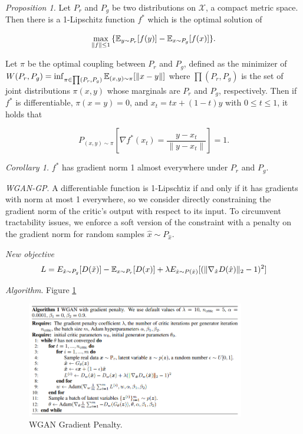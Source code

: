 \documentclass[english]{article}
\begin{document}
\item {\emph{Proposition 1.}}
Let $P_r$ and $P_g$ be two distributions on $\mathcal{X}$, a compact metric space. Then there is a 1-Lipschitz function $f^*$ which is the optimal solution of 

$$\max_{\|f\|\le 1} {\{\mathbb{E}_{y\sim P_r}[f(y)]-\mathbb{E}_{x\sim P_g}[f(x)]\}}.$$ 

Let $\pi$ be the optimal coupling between $P_r$ and $P_g$, defined as the minimizer of $W(P_r,P_g)=\inf_{\pi\in \prod(P_r,P_g)}\mathbb{E}_{(x,y)\sim\pi}[\|x-y\|]$ where $\prod(P_r,P_g)$ is the set of joint distributions $\pi(x,y)$ whose marginals are $P_r$ and $P_g$, respectively. Then if $f^*$ is differentiable, $\pi(x=y)=0$, and $x_t=tx+(1-t)y$ with $0\le t\le 1$, it holds that 

$$P_{(x,y)\sim\pi}[\nabla f^*(x_t)=\frac{y-x_t}{\|y-x_t\|}]=1.$$ 




\item {\emph{Corollary 1.}}
$f^*$ has gradient norm 1 almost everywhere under $P_r$ and $P_g$.




\item {\emph{WGAN-GP}}.
 A differentiable function is 1-Lipschtiz if and only if it has gradients with norm at most 1 everywhere, so we consider directly constraining the gradient norm of the critic’s output with respect to its input. To circumvent tractability issues, we enforce a soft version of the constraint with a penalty on the gradient norm for random samples $\hat{x}\sim P_{\hat{x}}$.




\item {\emph{New objective}}
$$L=E_{\Tilde{x}\sim P_g}[D(\Tilde{x})]-\mathbb{E}_{x\sim P_r}[D(x)]+\lambda E_{\hat{x}\sim P(\hat{x})}[(\|\nabla_{\hat{x}}D(\hat{x})\|_2 -1)^2]$$





\item {\emph{Algorithm}}. Figure \ref{wgan_gp}
\begin{figure}[h!]
  \centering
  \includegraphics[width=0.85\textwidth]{WGAN_GP.png}
    \caption{WGAN Gradient Penalty.}
  \label{wgan_gp}
 \end{figure}
\end{document}
